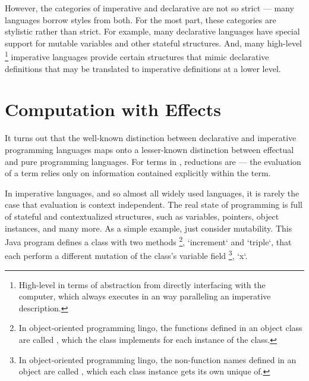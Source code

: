 However, the categories of imperative and declarative are not so strict --- many languages borrow styles from both.
For the most part, these categories are stylistic rather than strict.
For example, many declarative languages have special support for mutable variables and other stateful structures.
And, many high-level%
\footnote{High-level in terms of abstraction from directly interfacing with the computer, which always executes in an way paralleling an imperative description.}
imperative languages provide certain structures that mimic declarative definitions that may be translated to imperative definitions at a lower level.



\section{Computation with Effects}
\label{sec:computation-with-effects}

It turns out that the well-known distinction between declarative and imperative programming languages maps onto a lesser-known distinction between effectual and pure programming languages.
For terms in \LangA, reductions are  --- the evaluation of a term relies only on information contained explicitly within the term.

In imperative languages, and so almost all widely used languages, it is rarely the case that evaluation is context independent.
The real state of programming is full of stateful and contextualized structures, such as variables, pointers, object instances, and many more.
As a simple example, just consider mutability.
This Java program defines a class with two methods%
\footnote{
  In object-oriented programming lingo, the functions defined in an object class are called , which the class implements for each instance of the class.},
\code`increment` and \code`triple`,
that each perform a different mutation of the class's variable field%
\footnote{
  In object-oriented programming lingo, the non-function names defined in an object are called , which each class instance gets its own unique of.},
\code`x`.

